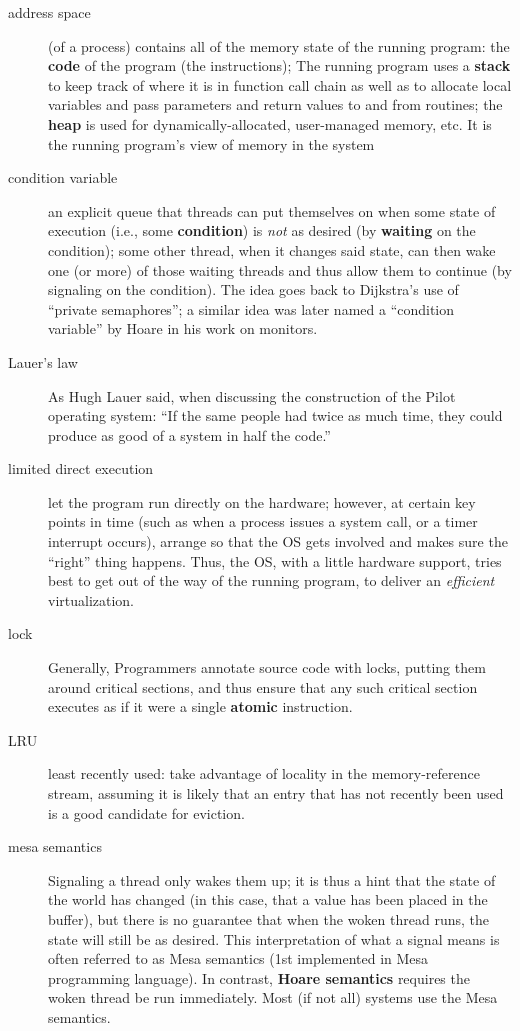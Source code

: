 \begin{description}
\item[address space] (of a process) contains all of the memory state of the
running program: the \textbf{code} of the program (the instructions); The running program uses a \textbf{stack} to keep track of where it is in function call chain as well as to allocate local variables and pass parameters and return values to and from routines; the \textbf{heap} is used for dynamically-allocated, user-managed memory, etc.  It is the running program’s view of memory in the system

\item[condition variable] an explicit queue that threads can put themselves on when some state of execution (i.e., some \textbf{condition}) is \emph{not} as desired (by \textbf{waiting} on the condition); some other thread, when it changes said state, can then wake one (or more) of those waiting threads and thus allow them to continue (by signaling on the condition). The idea goes back to Dijkstra's use of ``private semaphores''; a similar idea was later named a ``condition variable'' by Hoare in his work on monitors.

\item[Lauer's law] As Hugh Lauer said, when discussing the construction of the Pilot operating system: ``If the same people had twice as much time, they could produce as good of a system in half the code.''

\item[limited direct execution] let the program run directly on the hardware; however, at certain key points in time (such as when a process issues a system call, or a timer interrupt occurs), arrange so that the OS gets involved and makes sure the ``right'' thing happens.   Thus, the OS, with a little hardware support, tries best to get out of the way of the running program, to deliver an \emph{efficient} virtualization.

\item[lock] Generally, Programmers annotate source code with locks, putting them around critical sections, and thus ensure that any such critical section executes as if it were a single \textbf{atomic} instruction.

\item[LRU] least recently used: take advantage of locality in the memory-reference stream, assuming it is likely that an entry that has not recently been used is a good
candidate for eviction.

\item[mesa semantics] Signaling a thread only wakes them up; it is thus a hint that the state of the world has changed (in this case, that a value has been placed in the buffer), but there is no guarantee that when the woken thread runs, the state will still be as desired. This interpretation of what a signal means is often referred to as Mesa semantics (1st implemented in Mesa programming language). In contrast, \textbf{Hoare semantics} requires the woken thread be run immediately.  Most (if not all) systems use the Mesa semantics.


\end{description}

